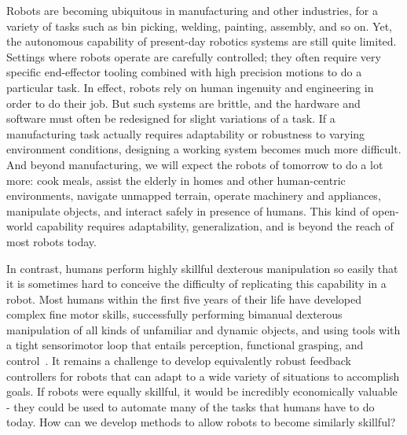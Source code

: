 Robots are becoming ubiquitous in manufacturing and other industries, for a variety of tasks such as bin picking, welding, painting, assembly, and so on.
Yet, the autonomous capability of present-day robotics systems are still quite limited.
Settings where robots operate are carefully controlled; they often require very specific end-effector tooling combined with high precision motions to do a particular task.
In effect, robots rely on human ingenuity and engineering in order to do their job.
But such systems are brittle, and the hardware and software must often be redesigned for slight variations of a task.
If a manufacturing task actually requires adaptability or robustness to varying environment conditions, designing a working system becomes much more difficult.
And beyond manufacturing, we will expect the robots of tomorrow to do a lot more: cook meals, assist the elderly in homes and other human-centric environments, navigate unmapped terrain, operate machinery and appliances, manipulate objects, and interact safely in presence of humans. 
This kind of open-world capability requires adaptability, generalization, and is beyond the reach of most robots today.

In contrast, humans perform highly skillful dexterous manipulation so easily that it is sometimes hard to conceive the difficulty of replicating this capability in a robot.
Most humans within the first five years of their life have developed complex fine motor skills, successfully performing bimanual dexterous manipulation of all kinds of unfamiliar and dynamic objects, and using tools with a tight sensorimotor loop that entails perception, functional grasping, and control~\citep{adolph2017motor}.
It remains a challenge to develop equivalently robust feedback controllers for robots that can adapt to a wide variety of situations to accomplish goals.
If robots were equally skillful, it would be incredibly economically valuable - they could be used to automate many of the tasks that humans have to do today.
How can we develop methods to allow robots to become similarly skillful?


